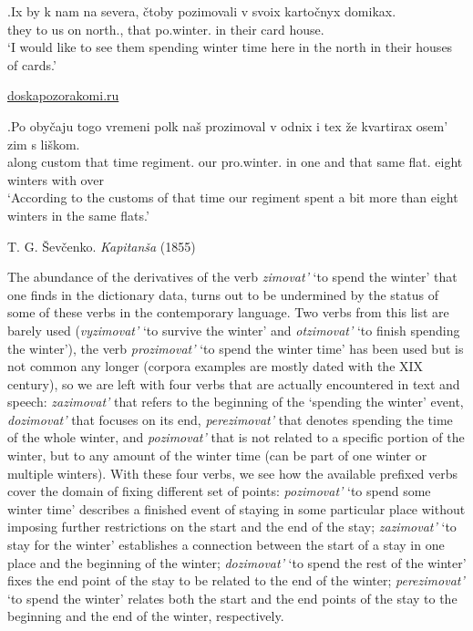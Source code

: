 \bg.\label{ex:pozimovat'}Ix by k nam na severa, \v{c}toby pozimovali v svoix karto\v{c}nyx domikax.\\
they {} to us on north., that po.winter. in their card house.\\
\vspace{0.5em}
`I would like to see them spending winter time here in the north in their houses of cards.'
\begin{flushright}
\vspace{-0.5em}
\url{doskapozorakomi.ru}
\end{flushright}
\bg.\label{ex:prozimovat'}Po oby\v{c}aju togo vremeni polk na\v{s} prozimoval v odnix i tex \v{z}e kvartirax osem' zim s li\v{s}kom.\\
along custom that time regiment. our pro.winter. in one and that same flat. eight winters with over\\
\vspace{0.5em}
`According to the customs of that time our regiment spent a bit more than eight winters in the same flats.'
\begin{flushright}
\vspace{-0.5em}
T. G. \v{S}ev\v{c}enko. \textit{Kapitan\v{s}a} (1855)
\end{flushright}

The abundance of the derivatives of the verb \textit{zimovat'} `to spend the winter' that one finds in the dictionary data, turns out to be undermined by the status of some of these verbs in the contemporary language. Two verbs from this list are barely used (\textit{vyzimovat'} `to survive the winter' and \textit{otzimovat'} `to finish spending the winter'), the verb \textit{prozimovat'} `to spend the winter time' has been used but is not common any longer (corpora examples are mostly dated with the XIX century), so we are left with four verbs that are actually encountered in text and speech: \textit{zazimovat'} that refers to the beginning of the `spending the winter' event, \textit{dozimovat'} that focuses on its end, \textit{perezimovat'} that denotes spending the time of the whole winter, and \textit{pozimovat'} that is not related to a specific portion of the winter, but to any amount of the winter time (can be part of one winter or multiple winters). With these four verbs, we see how the available prefixed verbs cover the domain of fixing different set of points: \textit{pozimovat'} `to spend some winter time' describes a finished event of staying in some particular place without imposing further restrictions on the start and the end of the stay; \textit{zazimovat'} `to stay for the winter' establishes a connection between the start of a stay in one place and the beginning of the winter; \textit{dozimovat'} `to spend the rest of the winter' fixes the end point of the stay to be related to the end of the winter; \textit{perezimovat'} `to spend the winter' relates both the start and the end points of the stay to the beginning and the end of the winter, respectively.


